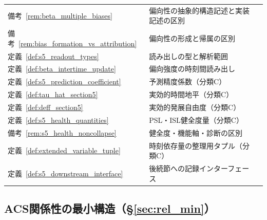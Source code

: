 \begin{longtable}{p{2.4cm} p{10.4cm} r}
備考~\ref{rem:beta_multiple_biases} & 偏向性の抽象的構造記述と実装記述の区別 & \pageref{rem:beta_multiple_biases} \\
備考~\ref{rem:bias_formation_vs_attribution} & 偏向性の形成と帰属の区別 & \pageref{rem:bias_formation_vs_attribution} \\
定義~\ref{def:s5_readout_types} & 読み出しの型と解析範囲 & \pageref{def:s5_readout_types} \\
定義~\ref{def:beta_intertime_update} & 偏向強度の時刻間読み出し & \pageref{def:beta_intertime_update} \\
定義~\ref{def:s5_prediction_coefficient} & 予測精度係数（分類C） & \pageref{def:s5_prediction_coefficient} \\
定義~\ref{def:tau_hat_section5} & 実効的時間地平（分類C） & \pageref{def:tau_hat_section5} \\
定義~\ref{def:deff_section5} & 実効的発展自由度（分類C） & \pageref{def:deff_section5} \\
定義~\ref{def:s5_health_quantities} & PSL・ISL健全度量（分類C） & \pageref{def:s5_health_quantities} \\
備考~\ref{rem:s5_health_noncollapse} & 健全度・機能軸・診断の区別 & \pageref{rem:s5_health_noncollapse} \\
定義~\ref{def:extended_variable_tuple} & 時刻依存量の整理用タプル（分類C） & \pageref{def:extended_variable_tuple} \\
定義~\ref{def:s5_downstream_interface} & 後続節への記録インターフェース & \pageref{def:s5_downstream_interface} \\
\end{longtable}
\endgroup

\subsection*{ACS関係性の最小構造（\S\ref{sec:rel_min}）}


